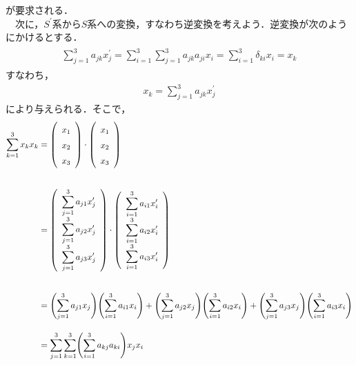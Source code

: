 が要求される．\\
　次に，$S^\prime$系から$S$系への変換，すなわち逆変換を考えよう．逆変換が次のようにかけるとする．
　 \begin{eqnarray*}
\begin{split}
\displaystyle\sum_{j=1}^3a_{jk}x^\prime_j
=\displaystyle\sum_{i=1}^3\displaystyle\sum_{j=1}^3a_{jk}a_{ji}x_i
=\displaystyle\sum_{i=1}^3\delta_{ki}x_i=x_k
  \end{split}
\end{eqnarray*}
すなわち，
\begin{align}
x_k=\displaystyle\sum_{j=1}^3a_{jk}x_j^\prime
  \end{align}
により与えられる．そこで，
  \begin{eqnarray*}
\begin{split}\displaystyle\sum_{k=1}^3x_k x_k
&=
\left(
\renewcommand{\arraystretch}{1.5}
    \begin{array}{c}
  x_1\\
  x_2\\
    x_3\\
    \end{array}
  \right)\cdot
  \left(
\renewcommand{\arraystretch}{1.5}
   \begin{array}{c}
  x_1\\
  x_2\\
    x_3\\
    \end{array}
  \right)\\[20pt]
  &=%
  \left(
\renewcommand{\arraystretch}{1.5}
    \begin{array}{c}
     \displaystyle\sum_{j=1}^3a_{j1}x_j^\prime\\
  \displaystyle\sum_{j=1}^3a_{j2}x_j^\prime\\
    \displaystyle\sum_{j=1}^3a_{j3}x_j^\prime\\
    \end{array}
  \right)\cdot
  \left(
\renewcommand{\arraystretch}{1.5}
    \begin{array}{c}
  \displaystyle\sum_{i=1}^3a_{i1}x_i^\prime\\
  \displaystyle\sum_{i=1}^3a_{i2}x_i^\prime\\
    \displaystyle\sum_{i=1}^3a_{i3}x_i^\prime\\
    \end{array}
  \right)\\[20pt]
  &=
\Biggl(\displaystyle\sum_{j=1}^3a_{j1}x_j\Biggr)\Biggl(\displaystyle\sum_{i=1}^3a_{i1}x_i\Biggr)
+\Biggl(\displaystyle\sum_{j=1}^3a_{j2}x_j\Biggr)\Biggl(\displaystyle\sum_{i=1}^3a_{i2}x_i\Biggr)
+\Biggl(\displaystyle\sum_{j=1}^3a_{j3}x_j\Biggr)\Biggl(\displaystyle\sum_{i=1}^3a_{i3}x_i\Biggr)\\[10pt]
&=\displaystyle\sum_{j=1}^3\displaystyle\sum_{k=1}^3\Biggl(\displaystyle\sum_{i=1}^3a_{kj}a_{ki}\Biggr)x_jx_i
  \end{split}
\end{eqnarray*}

